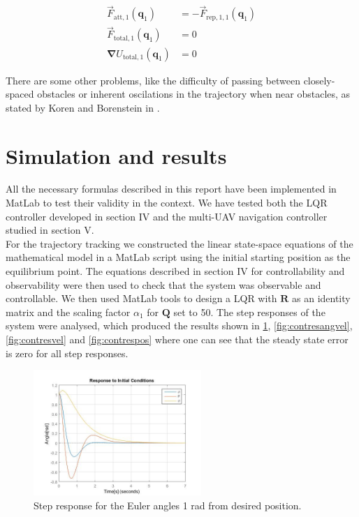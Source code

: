 \documentclass[journal]{IEEEtran}
\newcommand*{\subb}[1]{_{\mathrm{#1}}}
\begin{document}
		\begin{equation} \label{eq:cancel_example}
		\begin{split} 
					\vec{F}\subb{att,1}(\bm{q}\subb{1}) &= -\vec{F}\subb{rep,1,1}(\bm{q}\subb{1}) \\ \vec{F}\subb{total, 1}(\bm{q}\subb{1}) &= 0 \\   \bm{\nabla} U\subb{total, 1}(\bm{q}\subb{1})  &= 0
		\end{split}
		\end{equation}
		
		There are some other problems, like the difficulty of passing between closely-spaced obstacles or inherent oscilations in the trajectory when near obstacles, as stated by Koren and Borenstein in \cite{koren_pot_fields_limitations}. 
	
	\section{Simulation and results}
	All the necessary formulas described in this report have been implemented in MatLab to test their validity in the context. We have tested both the LQR controller developed in section IV and the multi-UAV navigation controller studied in section V. \\
	
	For the trajectory tracking we constructed the linear state-space equations of the mathematical model in a MatLab script using the initial starting position as the equilibrium point. The equations described in section IV for controllability and observability were then used to check that the system was observable and controllable.  We then used MatLab tools to design a LQR with $\bm{R}$ as an identity matrix and the scaling factor $\alpha\subb{1}$ for $\bm{Q}$ set to 50. The step responses of the system were analysed, which produced the results shown in \figurename{ \ref{fig:contresangles}}, \figurename{ \ref{fig:contresangvel}}, \figurename{ \ref{fig:contresvel}} and \figurename{ \ref{fig:contrespos}} where one can see that the steady state error is zero for all step responses.\\


	
		\begin{figure}[H]
  			\centering
  			\includegraphics[width=2.5in]{Results/Controll/Fig1}
  			\caption{Step response for the Euler angles 1 rad from desired position.}
  			\label{fig:contresangles}
		\end{figure}	
		
\end{document}
